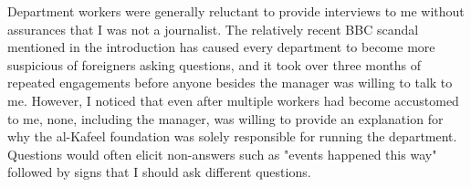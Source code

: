 

Department workers were generally reluctant to provide interviews to me without assurances that I was not a journalist. The relatively recent BBC scandal mentioned in the introduction has caused every department to become more suspicious of foreigners asking questions, and it took over three months of repeated engagements before anyone besides the manager was willing to talk to me. However, I noticed that even after multiple workers had become accustomed to me, none, including the manager, was willing to provide an explanation for why the al-Kafeel foundation was solely responsible for running the department. Questions would often elicit non-answers such as "events happened this way" followed by signs that I should ask different questions. 



